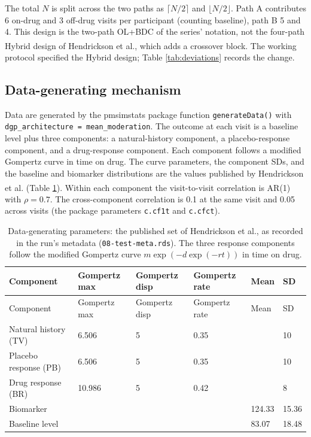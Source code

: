 \documentclass[
  11pt,
]{article}
\begin{document}
The total \(N\) is split across the two paths as \(\lceil N/2 \rceil\)
and \(\lfloor N/2 \rfloor\). Path A contributes 6 on-drug and 3
off-drug visits per participant (counting baseline), path B 5 and
4. This design is the two-path OL+BDC of the series' notation, not
the four-path Hybrid design of Hendrickson et al.\textsuperscript{}, which adds a
crossover block. The working protocol specified the Hybrid design;
Table \ref{tab:deviations} records the change.

\subsection{Data-generating mechanism}\label{data-generating-mechanism}

Data are generated by the pmsimstats package function
\texttt{generateData()} with \texttt{dgp\_architecture\ =\ \textquotesingle{}mean\_moderation\textquotesingle{}}. The
outcome at each visit is a baseline level plus three components: a
natural-history component, a placebo-response component, and a
drug-response component. Each component follows a modified Gompertz
curve in time on drug. The curve parameters, the component SDs, and
the baseline and biomarker distributions are the values published by
Hendrickson et al.\textsuperscript{} (Table \ref{tab:params}). Within each component
the visit-to-visit correlation is AR(1) with \(\rho = 0.7\). The
cross-component correlation is 0.1 at the same visit and 0.05 across
visits (the package parameters \texttt{c.cf1t} and \texttt{c.cfct}).

\begin{longtable}[]{@{}llllll@{}}
\caption{\label{tab:params} Data-generating parameters: the published set of Hendrickson et al., as recorded in the run's metadata (\protect\texttt{08-test-meta.rds}). The three response components follow the modified Gompertz curve \(m \exp(-d \exp(-r t))\) in time on drug.}\tabularnewline
\toprule\noalign{}
Component & Gompertz max & Gompertz disp & Gompertz rate & Mean & SD \\
\midrule\noalign{}
\endfirsthead
\toprule\noalign{}
Component & Gompertz max & Gompertz disp & Gompertz rate & Mean & SD \\
\midrule\noalign{}
\endhead
\bottomrule\noalign{}
\endlastfoot
Natural history (TV) & 6.506 & 5 & 0.35 & & 10 \\
Placebo response (PB) & 6.506 & 5 & 0.35 & & 10 \\
Drug response (BR) & 10.986 & 5 & 0.42 & & 8 \\
Biomarker & & & & 124.33 & 15.36 \\
Baseline level & & & & 83.07 & 18.48 \\
\end{longtable}
\end{document}
